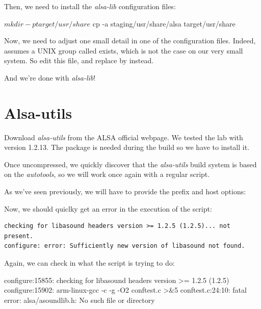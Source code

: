 Then, we need to install the {\em alsa-lib} configuration files:

\begin{bashinput}
$ mkdir -p target/usr/share
$ cp -a staging/usr/share/alsa target/usr/share
\end{bashinput}

Now, we need to adjust one small detail in one of the configuration
files. Indeed,  assumes a UNIX group
called  exists, which is not the case on our very small
system. So edit this file, and replace  by  instead.

And we're done with {\em alsa-lib}!

\section{Alsa-utils}

Download {\em alsa-utils} from the ALSA official webpage. We tested the lab
with version 1.2.13. The  package is needed during the build
so we have to install it.


Once uncompressed, we quickly discover that the {\em alsa-utils} build
system is based on the {\em autotools}, so we will work once again
with a regular  script.

As we've seen previously, we will have to provide the prefix and host
options:


Now, we should quiclky get an error in the execution of the
 script:

\begin{verbatim}
checking for libasound headers version >= 1.2.5 (1.2.5)... not present.
configure: error: Sufficiently new version of libasound not found.
\end{verbatim}

Again, we can check in  what the 
script is trying to do:

\begin{terminaloutput}
configure:15855: checking for libasound headers version >= 1.2.5 (1.2.5)
configure:15902: arm-linux-gcc -c -g -O2  conftest.c >&5
conftest.c:24:10: fatal error: alsa/asoundlib.h: No such file or directory
\end{terminaloutput}
\normalsize

